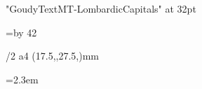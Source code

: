 \fontfam[alcuin]

\font\Lombardic "GoudyTextMT-LombardicCapitals" at 32pt\relax

\typosize[11/14]

\vsize=\topskip \advance \vsize by 42\baselineskip

\parskip0pt
\parindent0pt

\margins/2 a4 (17.5,,27.5,)mm

\onlycmyk
\def\Red{\setcmykcolor{0 0.9 0.9 0.15}}
\def\Blue{\setcmykcolor{0.7 0.5 0 0.3}}

\def\kapitel#1#2{%
	\noindent
	{\Red {\setff{letterspace=14}\currvar #1} \cdot\ #2}%
}

\newif\ifblue \bluetrue

\def\initial#1{%
	\par\null\par
	\ifblue
		\def\initialcolor{\Red}%
		\bluefalse
	\else
		\def\initialcolor{\Blue}%
		\bluetrue
	\fi
	\setbox0\hbox{\initialcolor\Lombardic #1}%
	\dimen0=5pt %
	\dimen1=3pt %
	\if #1D \dimen1=2pt\fi
	\if #1E \dimen0=3pt\fi
	\if #1G \dimen0=3pt\fi
	\if #1I \dimen0=6pt\fi
	\if #1J \dimen0=8pt\fi
	\if #1K \dimen0=6pt\fi
	\if #1M \dimen0=8pt\fi
	\if #1N \dimen0=6pt\fi
	\if #1O \dimen0=3pt \dimen1=2pt\fi
	\if #1P \dimen0=3.5pt\fi
	\if #1Q \dimen0=3pt\fi
	\if #1R \dimen0=6pt\fi
	\if #1U \dimen0=4pt\fi
	\if #1V \dimen0=7pt\fi
	\if #1W \dimen0=3pt\fi
	\if #1X \dimen0=3pt\fi
	\if #1Y \dimen0=7pt\fi
	\if #1Z \dimen0=2pt\fi
	\if #1Ö \dimen0=3pt\fi
	\dimen2=\dimexpr(\wd0-\dimen0+\dimen1)\relax %
	\dimen3=\dimexpr(\hsize-\dimen2)\relax %
	\ht0=0pt \dp0=0pt%
	\moveleft \dimen0 \box0
	\nobreak
	\vskip-2\baselineskip
	\parshape 3 \dimen2 \dimen3 \dimen2 \dimen3 0pt \hsize
	\noindent
}

\colsep=2.3em
